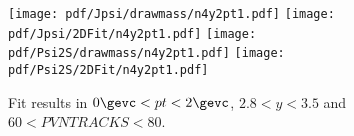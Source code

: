 \begin{figure}[H]
\begin{center}
\texttt{[image: pdf/Jpsi/drawmass/n4y2pt1.pdf]}
\texttt{[image: pdf/Jpsi/2DFit/n4y2pt1.pdf]}
\vspace*{-0.5cm}
\texttt{[image: pdf/Psi2S/drawmass/n4y2pt1.pdf]}
\texttt{[image: pdf/Psi2S/2DFit/n4y2pt1.pdf]}
\vspace*{-0.5cm}
\end{center}
\caption{Fit results in $0\gevc<pt<2\gevc$, $2.8<y<3.5$ and $60<PVNTRACKS<80$.}
\label{Fitn4y2pt1}
\end{figure}
